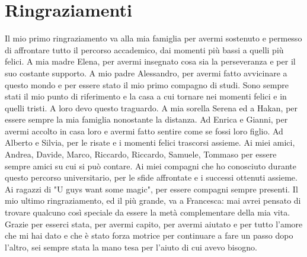 \chapter{Ringraziamenti}
Il mio primo ringraziamento va alla mia famiglia per avermi sostenuto e permesso di affrontare tutto il percorso accademico, dai momenti più bassi a quelli più felici.
A mia madre Elena, per avermi insegnato cosa sia la perseveranza e per il suo costante supporto. 
A mio padre Alessandro, per avermi fatto avvicinare a questo mondo e per essere stato il mio primo compagno di studi.
Sono sempre stati il mio punto di riferimento e la casa a cui tornare nei momenti felici e in quelli tristi. A loro devo questo traguardo.
A mia sorella Serena ed a Hakan, per essere sempre la mia famiglia nonostante la distanza.
Ad Enrica e Gianni, per avermi accolto in casa loro e avermi fatto sentire come se fossi loro figlio.
Ad Alberto e Silvia, per le risate e i momenti felici trascorsi assieme.
Ai miei amici, Andrea, Davide, Marco, Riccardo, Riccardo, Samuele, Tommaso per essere sempre amici su cui si può contare.
Ai miei compagni che ho conosciuto durante questo percorso universitario, per le sfide affrontate e i successi ottenuti assieme.
Ai ragazzi di "U guys want some magic", per essere compagni sempre presenti.
Il mio ultimo ringraziamento, ed il più grande, va a Francesca: mai avrei pensato di trovare qualcuno così speciale da essere la metà complementare della mia vita.
Grazie per esserci stata, per avermi capito, per avermi aiutato e per tutto l'amore che mi hai dato e che è stato forza motrice per continuare a fare un passo dopo l'altro, sei sempre stata la mano tesa per l'aiuto di cui avevo bisogno.